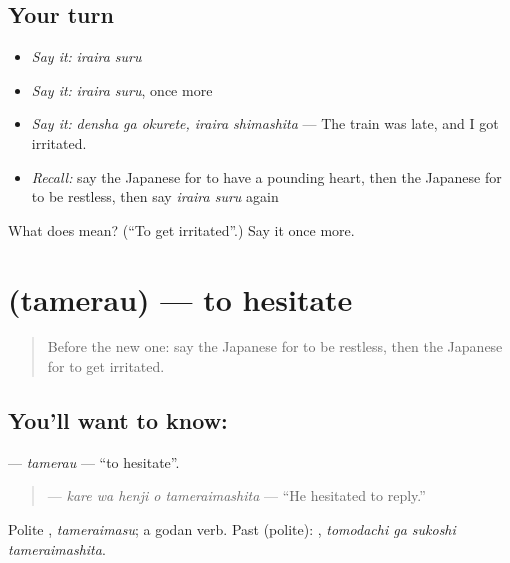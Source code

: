 \subsection*{Your turn}
\begin{itemize}
\raggedright
  \item \emph{Say it:} \emph{iraira suru}
  \item \emph{Say it:} \emph{iraira suru}, once more
  \item \emph{Say it:} \emph{densha ga okurete, iraira shimashita} — The train was late, and I got irritated.
  \item \emph{Recall:} say the Japanese for to have a pounding heart, then the Japanese for to be restless, then say \emph{iraira suru} again
\end{itemize}

\begin{tcolorbox}[breakable,colback=teal!4,colframe=teal!35!black,title={Before you move on}]
What does  mean? (\textquotedblleft{}To get irritated\textquotedblright{}.) Say it once more.
\end{tcolorbox}
\section[\texorpdfstring{\ja{ためらう} (tamerau)}{ためらう (tamerau)}]{ (tamerau) — to hesitate}

\label{lesson:JA-C427-tamerau}



\begin{quote}
Before the new one: say the Japanese for to be restless, then the Japanese for to get irritated.
\end{quote}

\subsection*{You'll want to know: }
\textbf{} — \emph{tamerau} — \textquotedblleft{}to hesitate\textquotedblright{}.

\begin{quote}
\textbf{  } — \emph{kare wa henji o tameraimashita} — \textquotedblleft{}He hesitated to reply.\textquotedblright{}
\end{quote}

Polite \textbf{}, \emph{tameraimasu}; a godan verb. Past (polite): \textbf{  }, \emph{tomodachi ga sukoshi tameraimashita}.

